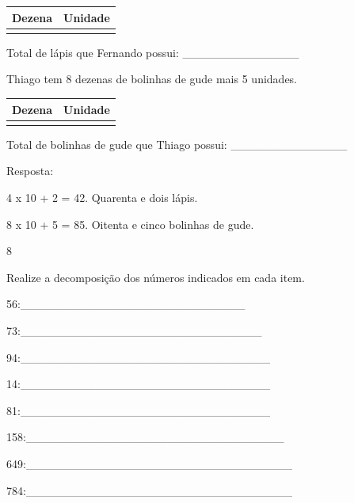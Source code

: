 \begin{longtable}[]{@{}ll@{}}
\toprule
Dezena & Unidade\tabularnewline
\midrule
\endhead
&\tabularnewline
\bottomrule
\end{longtable}

Total de lápis que Fernando possui: \_\_\_\_\_\_\_\_\_\_\_\_\_\_

\begin{escolha}

\item
  Thiago tem 8 dezenas de bolinhas de gude mais 5 unidades.
\end{escolha}

\begin{longtable}[]{@{}ll@{}}
\toprule
Dezena & Unidade\tabularnewline
\midrule
\endhead
&\tabularnewline
\bottomrule
\end{longtable}

Total de bolinhas de gude que Thiago possui:
\_\_\_\_\_\_\_\_\_\_\_\_\_\_

Resposta:

\begin{escolha}

\item
  4 x 10 + 2 = 42. Quarenta e dois lápis.
\item
  8 x 10 + 5 = 85. Oitenta e cinco bolinhas de gude.
\end{escolha}

\num{8}

Realize a decomposição dos números indicados em cada item.

\begin{escolha}

\item
  56:\_\_\_\_\_\_\_\_\_\_\_\_\_\_\_\_\_\_\_\_\_\_\_\_\_\_\_
\item
  73:\_\_\_\_\_\_\_\_\_\_\_\_\_\_\_\_\_\_\_\_\_\_\_\_\_\_\_\_\_
\item
  94:\_\_\_\_\_\_\_\_\_\_\_\_\_\_\_\_\_\_\_\_\_\_\_\_\_\_\_\_\_\_
\item
  14:\_\_\_\_\_\_\_\_\_\_\_\_\_\_\_\_\_\_\_\_\_\_\_\_\_\_\_\_\_\_
\item
  81:\_\_\_\_\_\_\_\_\_\_\_\_\_\_\_\_\_\_\_\_\_\_\_\_\_\_\_\_\_\_
\item
  158:\_\_\_\_\_\_\_\_\_\_\_\_\_\_\_\_\_\_\_\_\_\_\_\_\_\_\_\_\_\_\_
\item
  649:\_\_\_\_\_\_\_\_\_\_\_\_\_\_\_\_\_\_\_\_\_\_\_\_\_\_\_\_\_\_\_\_
\item
  784:\_\_\_\_\_\_\_\_\_\_\_\_\_\_\_\_\_\_\_\_\_\_\_\_\_\_\_\_\_\_\_\_
\end{escolha}

